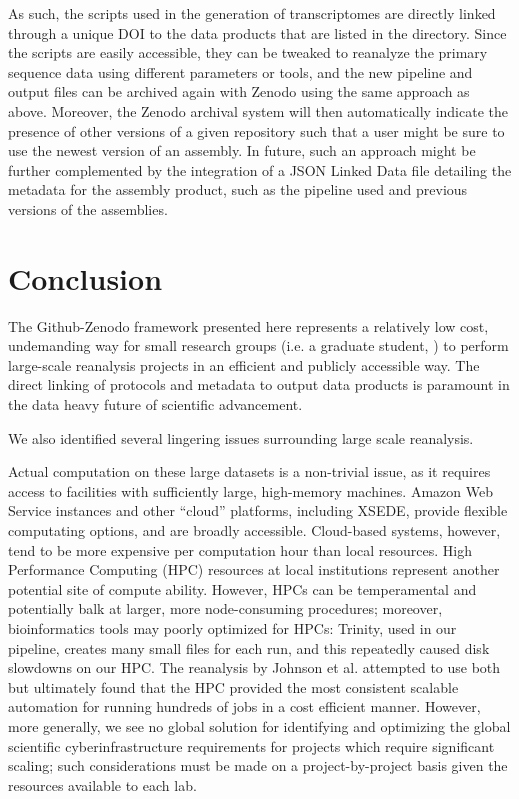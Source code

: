 \documentclass[12pt]{article}
\begin{document}
As such, the scripts used in the generation of transcriptomes are
directly linked through a unique DOI to the data products that are
listed in the directory. Since the scripts are easily accessible, they
can be tweaked to reanalyze the primary sequence data using different
parameters or tools, and the new pipeline and output files can be
archived again with Zenodo using the same approach as above.
Moreover, the Zenodo archival system will then automatically indicate
the presence of other versions of a given repository such that a user
might be sure to use the newest version of an assembly. In future,
such an approach might be further complemented by the integration of a
JSON Linked Data file detailing the metadata for the assembly product,
such as the pipeline used and previous versions of the assemblies.

\section{Conclusion}

The Github-Zenodo framework presented here represents a relatively low
cost, undemanding way for small research groups (i.e. a graduate
student, ) to perform large-scale reanalysis projects in an efficient
and publicly accessible way. The direct linking of protocols and
metadata to output data products is paramount in the data heavy future
of scientific advancement.

We also identified several lingering issues surrounding large scale
reanalysis.

Actual computation on these large datasets is a non-trivial issue, as
it requires access to facilities with sufficiently large, high-memory
machines.  Amazon Web Service instances and other ``cloud'' platforms,
including XSEDE, provide flexible computating options, and are broadly
accessible. Cloud-based systems, however, tend to be more expensive
per computation hour than local resources. High Performance Computing
(HPC) resources at local institutions represent another potential site
of compute ability.  However, HPCs can be temperamental and
potentially balk at larger, more node-consuming procedures; moreover,
bioinformatics tools may poorly optimized for HPCs: Trinity, used in
our pipeline, creates many small files for each run, and this
repeatedly caused disk slowdowns on our HPC.  The reanalysis by
Johnson et al. \cite{Cohen2017@@} attempted to use both but ultimately
found that the HPC provided the most consistent scalable automation
for running hundreds of jobs in a cost efficient manner.  However,
more generally, we see no global solution for identifying and
optimizing the global scientific cyberinfrastructure requirements for
projects which require significant scaling; such considerations must
be made on a project-by-project basis given the resources available to
each lab.
\end{document}
